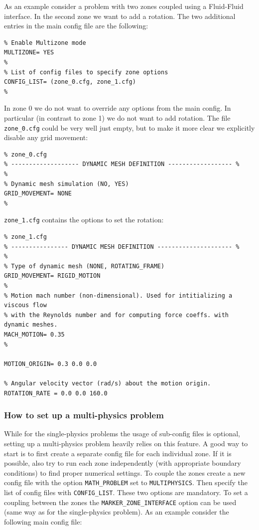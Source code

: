 \documentclass[12pt, a4paper, twoside]{article}
\begin{document}
As an example consider a problem with two zones coupled using a Fluid-Fluid interface. In the second zone we want to add a rotation. The two additional entries in the main config file are the following:

\begin{lstlisting}
% Enable Multizone mode
MULTIZONE= YES
%
% List of config files to specify zone options
CONFIG_LIST= (zone_0.cfg, zone_1.cfg)
%

\end{lstlisting}

In zone 0 we do not want to override any options from the main config. In particular (in contrast to zone 1) we do not want to add rotation. The file \verb|zone_0.cfg| could be very well just empty, but to make it more clear we explicitly disable any grid movement:

\begin{lstlisting}
% zone_0.cfg
% ------------------- DYNAMIC MESH DEFINITION ------------------ %
%
% Dynamic mesh simulation (NO, YES)
GRID_MOVEMENT= NONE
%

\end{lstlisting}

\verb|zone_1.cfg| contains the options to set the rotation:

\begin{lstlisting}
% zone_1.cfg
% ---------------- DYNAMIC MESH DEFINITION --------------------- %
%
% Type of dynamic mesh (NONE, ROTATING_FRAME)
GRID_MOVEMENT= RIGID_MOTION
%
% Motion mach number (non-dimensional). Used for intitializing a viscous flow
% with the Reynolds number and for computing force coeffs. with dynamic meshes.
MACH_MOTION= 0.35
%

MOTION_ORIGIN= 0.3 0.0 0.0

% Angular velocity vector (rad/s) about the motion origin. 
ROTATION_RATE = 0.0 0.0 160.0

\end{lstlisting}

\subsubsection{How to set up a multi-physics problem}

While for the single-physics problems the usage of sub-config files is optional, setting up a multi-physics problem heavily relies on this feature. A good way to start is to first create a separate config file for each individual zone. If it is possible, also try to run each zone independently (with appropriate boundary conditions) to find proper numerical settings. To couple the zones create a new config file with the option \verb|MATH_PROBLEM| set to \verb|MULTIPHYSICS|. Then specify the list of config files with \verb|CONFIG_LIST|. These two options are mandatory. To set a coupling between the zones the \verb|MARKER_ZONE_INTERFACE| option can be used (same way as for the single-physics problem). As an example consider the following main config file:
\end{document}

